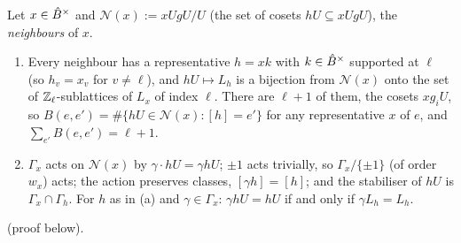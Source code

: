 \begin{lemma}[neighbours]\label{lem:s03-nbr}
Let $x\in\hat{B}^\times$ and $\mathcal N(x):=xUgU/U$ (the set of cosets $hU\subseteq xUgU$), the \emph{neighbours} of $x$.
\begin{enumerate}[label=(\alph*)]
\item Every neighbour has a representative $h=xk$ with $k\in\hat{B}^\times$ supported at $\ell$ (so $h_v=x_v$ for $v\ne\ell$), and $hU\mapsto L_h$ is a
  bijection from $\mathcal N(x)$ onto the set of $\mathbb{Z}_\ell$-sublattices of $L_x$ of index $\ell$. There are $\ell+1$ of them, the cosets $xg_iU$, so
  $B(e,e')=\#\{hU\in\mathcal N(x):[h]=e'\}$ for any representative $x$ of $e$, and $\sum_{e'}B(e,e')=\ell+1$.
\item $\Gamma_x$ acts on $\mathcal N(x)$ by $\gamma\cdot hU=\gamma hU$; $\pm1$ acts trivially, so $\Gamma_x/\{\pm1\}$ (of order $w_x$) acts; the action
  preserves classes, $[\gamma h]=[h]$; and the stabiliser of $hU$ is $\Gamma_x\cap\Gamma_h$. For $h$ as in (a) and $\gamma\in\Gamma_x$:
  $\gamma hU=hU$ if and only if $\gamma L_h=L_h$.
\end{enumerate}
\stproved{} (proof below).
\end{lemma}
